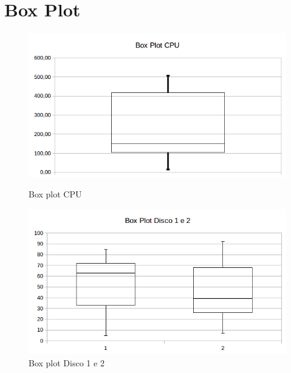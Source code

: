 \documentclass[11pt,a4paper,openany,oneside]{abntex2}
\begin{document}


	
\section{\textbf{Box Plot}}
\begin{figure}[H]
	\begin{minipage}[b]{0.45\linewidth}
		\centering
		\includegraphics[width=\textwidth]{boxplotcpu.png}
		\caption{Box plot CPU}
		\label{fig:boxplotcpu}
	\end{minipage}
	\hspace{0.5cm}
	\begin{minipage}[b]{0.45\linewidth}
		\centering
		\includegraphics[width=\textwidth]{boxplotdiscos.png}
		\caption{Box plot Disco 1 e 2}
		\label{fig:boxplotd1d2}
					
	\end{minipage}
	
\end{figure}
	
\end{document}
